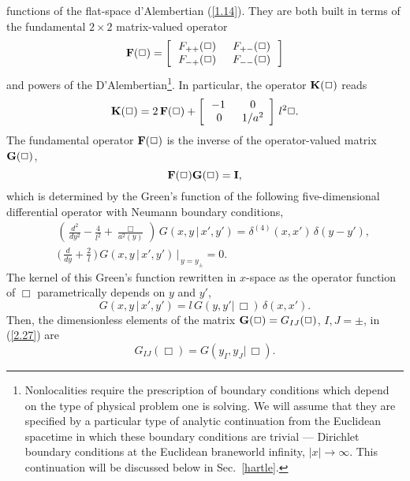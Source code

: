 \documentclass[a4paper,preprint,nofootinbib,
                 showpacs,preprintnumbers,amsmath,amssymb]{revtex4}
\begin{document}
functions of the flat-space d'Alembertian (\ref{1.14}). They are 
both built in terms of the fundamental $2\times2$ matrix-valued 
operator 
  \begin{equation} 
  {\bf F}(\Box)= 
  \left[\begin{array}{cc} 
  \,F_{++}(\Box)\, &\,\,F_{+-}(\Box)\,\\ 
  \,F_{-+}(\Box)\, &\,\,F_{--}(\Box)\, 
  \end{array}\right]                      \label{1.15} 
    \end{equation} 
and powers of the D'Alembertian\footnote{Nonlocalities 
require the prescription of boundary conditions 
which depend on the type of physical problem one is solving. 
We will assume 
that they are specified by a particular type of analytic continuation 
from the Euclidean spacetime in which these boundary conditions are 
trivial --- Dirichlet boundary conditions at the Euclidean braneworld 
infinity, $|x|\to\infty$. This continuation will be discussed below in 
Sec.~\ref{hartle}.}.  In particular, the operator ${\bf K}(\Box)$ reads 
  \begin{equation} 
  {\bf K}(\Box)=2\,{\bf F}(\Box) 
  +\left[\begin{array}{cc} 
      \,-1\,\,&\,0  \\ \,\,0\,\,&\,1/a^2 
  \end{array}\right]\,l^2\Box.               \label{1.16} 
  \end{equation} 
The fundamental operator ${\bf F}(\Box)$ is the inverse of the 
operator-valued matrix ${\bf G}(\Box)$, 
    \begin{equation} 
    {\bf F}(\Box){\bf G}(\Box)={\bf I},        \label{2.27} 
    \end{equation} 
which is determined by the Green's function of the following 
five-dimensional differential operator with Neumann boundary 
conditions, 
    \begin{eqnarray} 
    &&\left(\,\frac{d^2}{d y^2} 
    -\frac{4}{l^2} + 
    \frac{\Box}{a^2 (y)}\,\right) 
    \,G(x,y\,|\,x',y') 
    =\delta^{(4)}(x,x')\,\delta(y-y'),            \label{2.16a}\\ 
    &&\Big(\,\frac d{dy} 
    + \frac{2}{l}\,\Big)\, 
    G(x,y\,|\,x',y')\,\Big|_{\,y=y_\pm}=0.         \label{2.16} 
    \end{eqnarray} 
The kernel of this Green's function rewritten in $x$-space as the 
operator function of $\Box$ parametrically depends on $y$ and $y'$, 
    \begin{equation} 
    G(x,y\,|\,x',y')= 
    l\,G(y,y'|\,\Box)\,\delta(x,x').     \label{2.18} 
    \end{equation} 
Then, the dimensionless elements of the matrix ${\bf 
G}(\Box)=G_{IJ}(\Box)$, $I,J=\pm$, in (\ref{2.27}) are 
    \begin{equation} 
    G_{IJ}(\Box)=G(y_I,y_J|\,\Box).     \label{2.18a} 
    \end{equation} 
 
\end{document}
